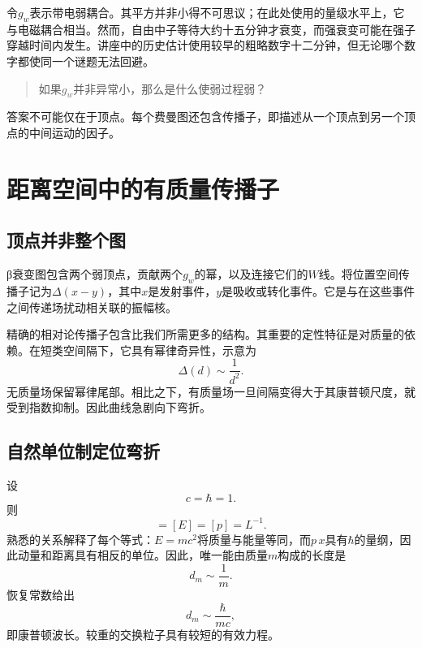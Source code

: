 令\(g_w\)表示带电弱耦合。其平方并非小得不可思议；在此处使用的量级水平上，它与电磁耦合相当。然而，自由中子等待大约十五分钟才衰变，而强衰变可能在强子穿越时间内发生。讲座中的历史估计使用较早的粗略数字十二分钟，但无论哪个数字都使同一个谜题无法回避。
\begin{quote}
如果\(g_w\)并非异常小，那么是什么使弱过程弱？
\end{quote}

答案不可能仅在于顶点。每个费曼图还包含传播子，即描述从一个顶点到另一个顶点的中间运动的因子。

\section{距离空间中的有质量传播子}

\subsection{顶点并非整个图}

{\proseunicodefont β}衰变图包含两个弱顶点，贡献两个\(g_w\)的幂，以及连接它们的\(W\)线。将位置空间传播子记为\(\Delta(x-y)\)，其中\(x\)是发射事件，\(y\)是吸收或转化事件。它是与在这些事件之间传递场扰动相关联的振幅核。

精确的相对论传播子包含比我们所需更多的结构。其重要的定性特征是对质量的依赖。在短类空间隔下，它具有幂律奇异性，示意为
\begin{equation}
  \Delta(d)\sim\frac1{d^2}.
\end{equation}
无质量场保留幂律尾部。相比之下，有质量场一旦间隔变得大于其康普顿尺度，就受到指数抑制。因此曲线急剧向下弯折。

\subsection{自然单位制定位弯折}

设
\begin{equation}
  c=\hbar=1.
\end{equation}
则
\begin{equation}
  [m]=[E]=[p]=L^{-1}.
\end{equation}
熟悉的关系解释了每个等式：\(E=mc^2\)将质量与能量等同，而\(p\,x\)具有\(\hbar\)的量纲，因此动量和距离具有相反的单位。因此，唯一能由质量\(m\)构成的长度是
\begin{equation}
  d_m\sim\frac1m.
\end{equation}
恢复常数给出
\begin{equation}
  d_m\sim\frac{\hbar}{mc},
\end{equation}
即康普顿波长。较重的交换粒子具有较短的有效力程。

